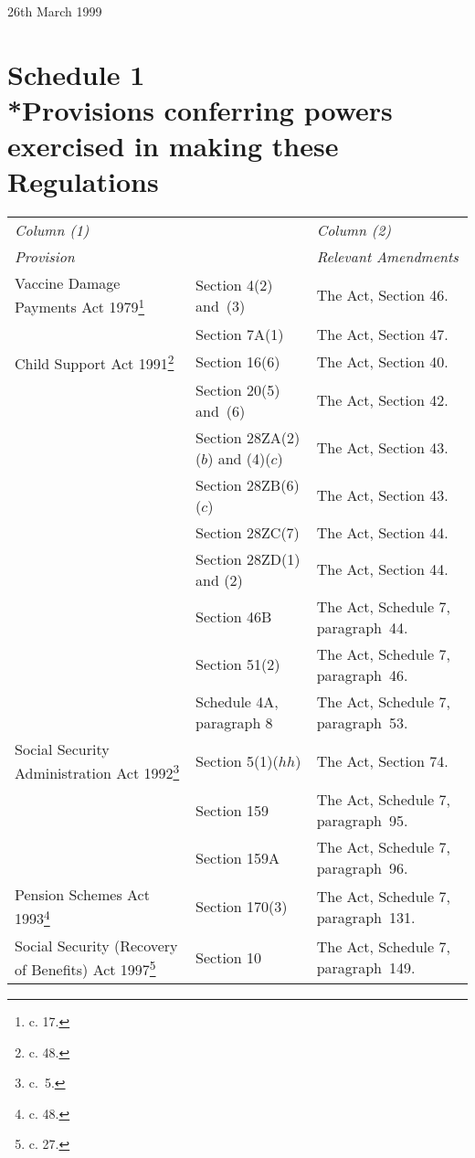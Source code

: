 \documentclass[12pt,a4paper]{article}
\begin{document}
26th March 1999

\small

\part[Schedule 1 --- Provisions conferring powers exercised in making these Regulations]{Schedule 1\\*Provisions conferring powers exercised in making these Regulations}

\renewcommand\parthead{--- Schedule 1}

{\footnotesize{}
\begin{longtable}{p{150pt}p{102pt}p{102pt}}
\hline
\itshape Column (1) & & \itshape Column (2)\\
\itshape Provision & & \itshape Relevant Amendments\\
\hline
\endhead
\hline
\endlastfoot
Vaccine Damage Payments Act 1979\footnote{\frenchspacing 1979 c. 17.}&Section 4(2) and~(3)&The Act, Section 46.\\
&Section 7A(1)&The Act, Section 47.\\
Child Support Act 1991\footnote{\frenchspacing 1991 c. 48.}&Section 16(6)&The Act, Section 40.\\
&Section 20(5) and~(6)&The Act, Section 42.\\
&Section 28ZA(2)($b$) and (4)($c$)&The Act, Section 43.\\
&Section 28ZB(6)($c$)&The Act, Section 43.\\
&Section 28ZC(7)&The Act, Section 44.\\
&Section 28ZD(1) and (2)&The Act, Section 44.\\
&Section 46B&The Act, Schedule 7, paragraph~44.\\
&Section 51(2)&The Act, Schedule 7, paragraph~46.\\
&Schedule 4A, paragraph 8&The Act, Schedule 7, paragraph~53.\\
Social Security Administration Act 1992\footnote{\frenchspacing 1992 c.~5.}&Section 5(1)($hh$)&The Act, Section 74.\\
&Section 159&The Act, Schedule 7, paragraph~95.\\
&Section 159A&The Act, Schedule 7, paragraph~96.\\
Pension Schemes Act 1993\footnote{\frenchspacing 1993 c. 48.}&Section 170(3)&The Act, Schedule 7, paragraph~131.\\
Social Security (Recovery of Benefits) Act 1997\footnote{\frenchspacing 1997 c. 27.}&Section 10&The Act, Schedule 7, paragraph~149.\\

\end{longtable}}
\end{document}
